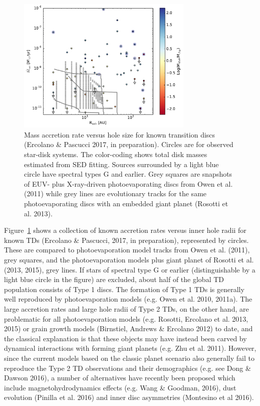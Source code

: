 \documentclass[10pt,fleqn,twoside]{article}
\begin{document}
\begin{figure}
\centerline{\includegraphics[width=0.75\textwidth]{figures/Macc_Rhole_Mdisk.pdf}}
\caption{\label{fig-macc-rhole-mdisk}
  Mass accretion rate versus hole size for known transition
  discs (Ercolano \& Pascucci 2017, in preparation). Circles are for
  observed star-disk systems. The color-coding shows total disk masses
  estimated from SED fitting. Sources surrounded by a
  light blue circle have spectral types G and earlier. Grey squares
  are snapshots of EUV- plus X-ray-driven photoevaporating discs from
  Owen et al. (2011) while grey lines are evolutionary tracks for the
  same photoevaporating discs with an embedded giant planet (Rosotti 
  et al. 2013).} 
\end{figure}

Figure~\ref{fig-macc-rhole-mdisk} shows a collection of known accretion rates versus inner hole
radii for known TDs (Ercolano \& Pascucci, 2017, in preparation),
represented by circles. These are compared to photoevaporation model tracks from
Owen et al. (2011), grey squares, and the photoevaporation models plus giant planet
of Rosotti et al. (2013, 2015), grey lines. 
If stars of spectral type G or earlier (distinguishable by a light
blue circle in the figure) are excluded, about half of the global TD population consists of Type 1
discs. The formation of Type 1 TDs is generally well reproduced by
photoevaporation models (e.g. Owen et al. 2010, 2011a). The large accretion rates and large hole
radii of Type 2 TDs, on the other hand, are problematic for all 
photoevaporation models (e.g. Rosotti, Ercolano et al. 2013, 2015) or grain
growth models (Birnstiel, Andrews \& Ercolano 2012) to date, and the classical explanation is that
these objects may have instead been carved by dynamical interactions
with forming giant planets (e.g. Zhu et al. 2011). However, since the
current models based on the classic planet scenario also generally
fail to reproduce the Type 2 TD observations and 
their demographics (e.g. see Dong \& Dawson 2016),
a number of alternatives have recently been proposed which include magnetohydrodynamics
effects (e.g. Wang \& Goodman, 2016), dust evolution (Pinilla et
al. 2016) and inner disc asymmetries (Montesino et al 2016). 
\end{document}
